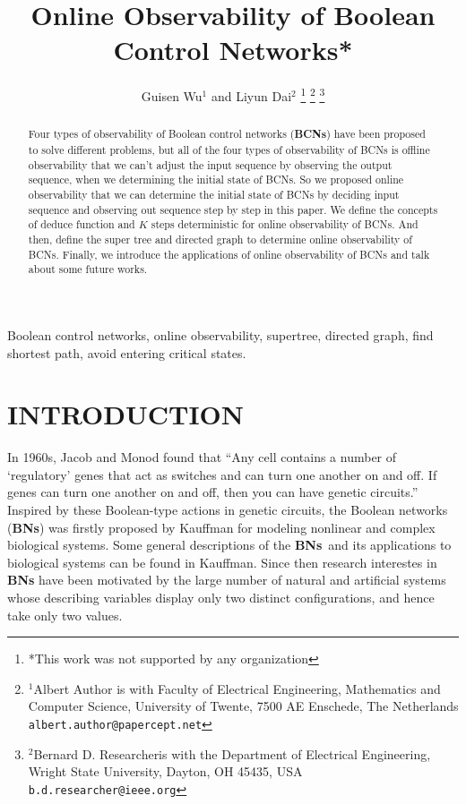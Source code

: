 \documentclass[letterpaper, 10 pt, conference]{ieeeconf}  %
\title{\LARGE \bf
Online Observability of Boolean Control Networks*
}
\author{Guisen Wu$^{1}$ and Liyun Dai$^{2}$%
\thanks{*This work was not supported by any organization}%
\thanks{$^{1}$Albert Author is with Faculty of Electrical Engineering, Mathematics and Computer Science,
        University of Twente, 7500 AE Enschede, The Netherlands
        {\tt\small albert.author@papercept.net}}%
\thanks{$^{2}$Bernard D. Researcheris with the Department of Electrical Engineering, Wright State University,
        Dayton, OH 45435, USA
        {\tt\small b.d.researcher@ieee.org}}%
}
\def \BNs {{\bf BNs}}
\begin{document}
\maketitle
\thispagestyle{empty}
\pagestyle{empty}


\begin{abstract}

Four types of observability of Boolean control networks ({\bf BCNs}) have been proposed to solve different problems, but all of the four types of observability of BCNs is offline observability that we can't adjust the input sequence by observing the output sequence, when we determining the initial state of BCNs. So we proposed online observability that we can determine the initial state of BCNs by deciding input sequence and observing out sequence step by step in this paper. We define the concepts of deduce function and $K$ steps deterministic for online observability of BCNs. And then, define the super tree and directed graph to determine online observability of BCNs. Finally, we introduce the applications of online observability of BCNs and talk about some future works.
\end{abstract}


\begin{keywords}

Boolean control networks, online observability, supertree, directed graph, find shortest path, avoid entering critical states. 

\end{keywords}

\section{INTRODUCTION}

In 1960s, Jacob and Monod found that  ``Any cell contains a number of `regulatory' genes that act as switches and can turn one another on and off. If genes can turn one another on and off, then you can have genetic circuits.''  Inspired by these Boolean-type actions in genetic circuits, the Boolean networks ({\bf BNs}) was firstly proposed by Kauffman for modeling nonlinear and complex biological systems. Some general descriptions of the \BNs\ and its applications to biological systems can be found in Kauffman. Since then research interestes in {\bf BNs} have been motivated by the large number of natural and artificial systems whose describing variables display only two distinct configurations, and hence take only two values.
\end{document}
